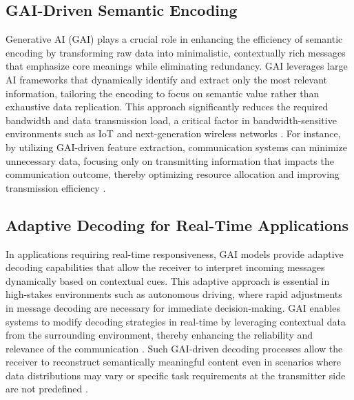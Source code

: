 \documentclass[journal]{IEEEtran}
\begin{document}
\subsection{GAI-Driven Semantic Encoding}
Generative AI (GAI) plays a crucial role in enhancing the efficiency of semantic encoding by transforming raw data into minimalistic, contextually rich messages that emphasize core meanings while eliminating redundancy. GAI leverages large AI frameworks that dynamically identify and extract only the most relevant information, tailoring the encoding to focus on semantic value rather than exhaustive data replication. This approach significantly reduces the required bandwidth and data transmission load, a critical factor in bandwidth-sensitive environments such as IoT and next-generation wireless networks \cite{chaccour2022dataknowledgebuildinggeneration}. For instance, by utilizing GAI-driven feature extraction, communication systems can minimize unnecessary data, focusing only on transmitting information that impacts the communication outcome, thereby optimizing resource allocation and improving transmission efficiency \cite{10634888,10614204}.

\subsection{Adaptive Decoding for Real-Time Applications}
In applications requiring real-time responsiveness, GAI models provide adaptive decoding capabilities that allow the receiver to interpret incoming messages dynamically based on contextual cues. This adaptive approach is essential in high-stakes environments such as autonomous driving, where rapid adjustments in message decoding are necessary for immediate decision-making. GAI enables systems to modify decoding strategies in real-time by leveraging contextual data from the surrounding environment, thereby enhancing the reliability and relevance of the communication \cite{10614204}. Such GAI-driven decoding processes allow the receiver to reconstruct semantically meaningful content even in scenarios where data distributions may vary or specific task requirements at the transmitter side are not predefined \cite{10447237}.
\end{document}
